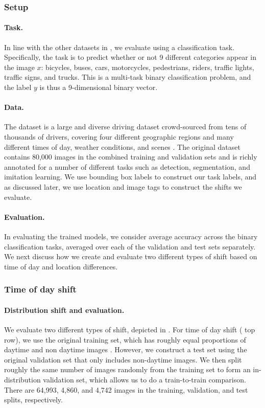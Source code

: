 \subsubsection{Setup}

\paragraph{Task.}
In line with the other datasets in \Wilds, we evaluate using a classification task. Specifically,
the task is to predict whether or not 9 different categories appear in the image $x$: bicycles,
buses, cars, motorcycles, pedestrians, riders, traffic lights, traffic signs, and trucks. This is a
multi-task binary classification problem, and the label $y$ is thus a 9-dimensional binary vector.

\paragraph{Data.}
The \BDD dataset is a large and diverse driving dataset crowd-sourced from tens of thousands of
drivers, covering four different geographic regions and many different times of day, weather
conditions, and scenes \citep{yu20cvpr}. The original dataset contains 80,000 images in the combined
training and validation sets and is richly annotated for a number of different tasks such as
detection, segmentation, and imitation learning. We use bounding box labels to construct our task
labels, and as discussed later, we use location and image tags to construct the shifts we evaluate.

\paragraph{Evaluation.}
In evaluating the trained models, we consider average accuracy across the binary classification
tasks, averaged over each of the validation and test sets separately. We next discuss how we create
and evaluate two different types of shift based on time of day and location differences.

\subsubsection{Time of day shift}

\paragraph{Distribution shift and evaluation.}
We evaluate two different types of shift, depicted in . For time of day
shift ( top row), we use the original \BDD training set, which has roughly
equal proportions of daytime and non daytime images \citep{yu20cvpr}. However, we construct a test
set using the original \BDD validation set that only includes non-daytime images. We then split
roughly the same number of images randomly from the training set to form an in-distribution
validation set,
which allows us to do a train-to-train comparison. There are 64,993, 4,860, and 4,742 images in the training, validation, and test
splits, respectively.


